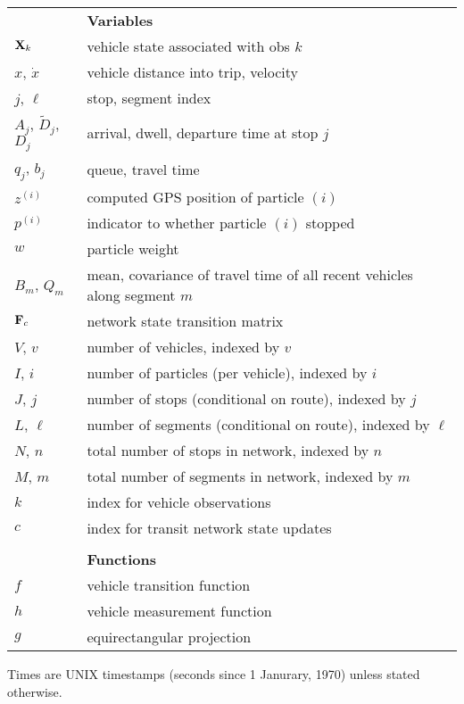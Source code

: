 \documentclass[draftcls,a4paper,onecolumn]{IEEEtran}\usepackage[]{graphicx}\usepackage[]{color}
\begin{document}
\begin{xtabular}{ll}
  \bottomrule
  \\ \toprule
  &\textbf{Variables} \\ \midrule
  $\mathbf{X}_k$ & vehicle state associated with obs $k$ \\
  $x$, $\dot x$ & vehicle distance into trip, velocity \\
  $j$, $\ell$ & stop, segment index \\
  $A_j$, $\tilde D_j$, $D_j$ & arrival, dwell, departure time at stop $j$ \\
  $q_j$, $b_j$ & queue, travel time \\
  $z^{(i)}$ & computed GPS position of particle $(i)$ \\
  $p^{(i)}$ & indicator to whether particle $(i)$ stopped \\
  $w$ & particle weight \\
  $B_m$, $Q_m$ & mean, covariance of travel time of all recent vehicles along segment $m$ \\
  $\mathbf{F}_c$ & network state transition matrix \\
  $V$, $v$ & number of vehicles, indexed by $v$ \\
  $I$, $i$ & number of particles (per vehicle), indexed by $i$ \\
  $J$, $j$ & number of stops (conditional on route), indexed by $j$ \\
  $L$, $\ell$ & number of segments (conditional on route), indexed by $\ell$ \\
  $N$, $n$ & total number of stops in network, indexed by $n$ \\
  $M$, $m$ & total number of segments in network, indexed by $m$ \\
  $k$ & index for vehicle observations \\
  $c$ & index for transit network state updates \\
  \bottomrule
  \\ \toprule
  &\textbf{Functions} \\ \midrule
  $f$ & vehicle transition function \\
  $h$ & vehicle measurement function \\
  $g$ & equirectangular projection \\
  \bottomrule
\end{xtabular}
  


\vspace{1em}
Times are UNIX timestamps (seconds since 1 Janurary, 1970) unless stated otherwise.
\end{document}
